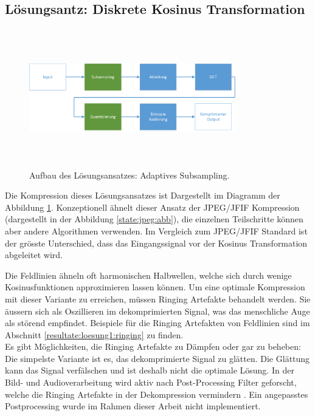 \subsection{Lösungsantz: Diskrete Kosinus Transformation}\label{konzept:loesung1}
\begin{figure}[!htbp]
	\center
	\includegraphics[width=0.8\textwidth,height=6cm,keepaspectratio]{./pictures/konzept/solution1/aufbau.png}
	\caption{Aufbau des Lösungsansatzes: Adaptives Subsampling.}
	\label{konzept:loesung1:aufbau}
\end{figure} 
Die Kompression dieses Lösungsansatzes ist Dargestellt im Diagramm der Abbildung \ref{konzept:loesung1:aufbau}. Konzeptionell ähnelt dieser Ansatz der JPEG/JFIF Kompression (dargestellt in der Abbildung \ref{state:jpeg:abb}), die einzelnen Teilschritte können aber andere Algorithmen verwenden. Im Vergleich zum JPEG/JFIF Standard ist der grösste Unterschied, dass das Eingangssignal vor der Kosinus Transformation abgeleitet wird.

Die Feldlinien ähneln oft harmonischen Halbwellen, welche sich durch wenige Kosinusfunktionen approximieren lassen können. Um eine optimale Kompression mit dieser Variante zu erreichen, müssen Ringing Artefakte \cite{wiki:ringing:artefacts} behandelt werden. Sie äussern sich als Oszillieren im dekomprimierten Signal, was das menschliche Auge als störend empfindet. Beispiele für die Ringing Artefakten von Feldlinien sind im Abschnitt \ref{resultate:loesung1:ringing} zu finden.\\
Es gibt Möglichkeiten, die Ringing Artefakte zu Dämpfen oder gar zu beheben: Die simpelste Variante ist es, das dekomprimierte Signal zu glätten. Die Glättung kann das Signal verfälschen und ist deshalb nicht die optimale Lösung. In der Bild- und Audioverarbeitung wird aktiv nach Post-Processing Filter geforscht, welche die Ringing Artefakte in der Dekompression vermindern \cite{kaup1998reduction} \cite{park1999postprocessing}. Ein angepasstes Postprocessing wurde im Rahmen dieser Arbeit nicht implementiert.

